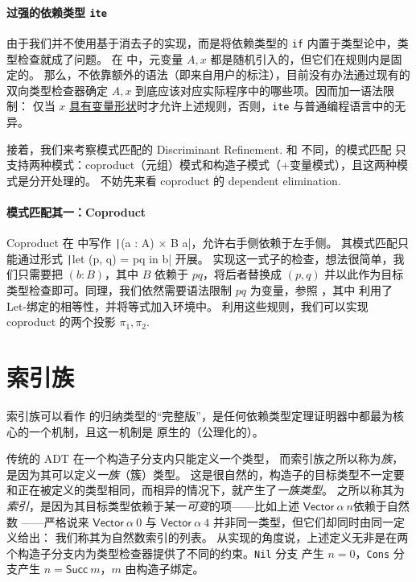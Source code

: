 \paragraph{过强的依赖类型 \texttt{ite}}
由于我们并不使用基于消去子的实现，而是将依赖类型的 \texttt{if} 内置于类型论中，类型检查就成了问题。
在  中，元变量 $A, x$ 都是随机引入的，但它们在规则内是固定的。
那么，不依靠额外的语法（即来自用户的标注），目前没有办法通过现有的双向类型检查器确定 $A, x$
到底应该对应实际程序中的哪些项。因而加一语法限制：
仅当 $x$ \underline{具有变量形状}时才允许上述规则，否则，\texttt{ite} 与普通编程语言中的无异。

接着，我们来考察模式匹配的 Discriminant Refinement. 和 \Tigris 不同，\Tigrisd 的模式匹配
只支持两种模式：coproduct（元组）模式和构造子模式（+变量模式），且这两种模式是分开处理的。
不妨先来看 coproduct 的 dependent elimination.
\paragraph{模式匹配其一：Coproduct}
Coproduct 在 \Tigrisd 中写作 \texttt|(a : A) × B a|，允许右手侧依赖于左手侧。
其模式匹配只能通过形式 \texttt|let (p, q) = pq in b| 开展。
实现这一式子的检查，想法很简单，我们只需要把 $(b : B)$，其中 $B$ 依赖于 $pq$，将后者替换成 $(p, q)$
并以此作为目标类型检查即可。同理，我们依然需要语法限制 $pq$ 为变量，参照 ，其中  利用了 Let-绑定的相等性，并将等式加入环境中。
利用这些规则，我们可以实现 coproduct 的两个投影 $\pi_1,\pi_2$.

\section{索引族}
索引族可以看作 \Tigris 的归纳类型的“完整版”，是任何依赖类型定理证明器中都最为核心的一个机制，且这一机制是
原生的（公理化的）。

传统的 ADT 在一个构造子分支内只能定义一个类型，
而索引族之所以称为\emph{族}，是因为其可以定义\emph{一族}（簇）类型。
这是很自然的，构造子的目标类型不一定要和正在被定义的类型相同，而相异的情况下，就产生了\emph{一族类型}。
之所以称其为\emph{索引}，是因为其目标类型依赖于某一\emph{可变}的项——比如上述 $\mathsf{Vector}\ \alpha\ n$依赖于自然数
——严格说来 $\mathsf{Vector}\ \alpha\ 0$ 与 $\mathsf{Vector}\ \alpha\ 4$ 并非同一类型，但它们却同时由同一定义给出：
我们称其为自然数索引的列表。
从实现的角度说，上述定义无非是在两个构造子分支内为类型检查器提供了不同的约束。\texttt{Nil} 分支
产生 $n=0$，\texttt{Cons} 分支产生 $n = \mathsf{Succ}\ m$，$m$ 由构造子绑定。

